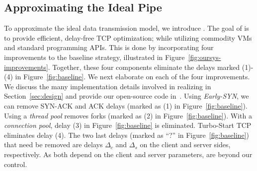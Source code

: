 \subsection{Approximating the Ideal Pipe}\label{sec:approx}

To approximate the ideal data transmission model, we introduce \textit{\oursys}.
The goal of \oursys is to provide efficient, delay-free TCP optimization; while utilizing commodity VMs and standard programming APIs. This is done by incorporating four improvements to the baseline strategy, illustrated in Figure~\ref{fig:oursys-improvements}. Together, these four components eliminate the delays marked (1)-(4) in Figure~\ref{fig:baseline}. We next elaborate on each of the four improvements. We discuss the many implementation details involved in realizing \oursys in Section~\ref{sec:design} and provide our open-source code in~\cite{ktcp}.
Using \textit{Early-SYN}, we can remove SYN-ACK and ACK delays (marked as (1) in Figure~\ref{fig:baseline}). Using a \textit{thread pool} removes forks (marked as (2) in Figure~\ref{fig:baseline}). With a \textit{connection pool}, delay (3) in Figure~\ref{fig:baseline} is eliminated. Turbo-Start TCP eliminates delay (4). The two last delays (marked as ``?'' in Figure~\ref{fig:baseline}) that need be removed are delays $\Delta_c$ and $\Delta_s$ on the client and server sides, respectively. As both depend on the client and server parameters, are beyond our control.




